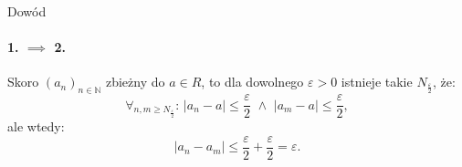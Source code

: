 \documentclass{article}
\newcommand{\N}{\mathbb{N}}
\newcommand{\eps}{\varepsilon}
\newcommand{\ciag}[1]{(#1_{n})_{n \in \N}}
\begin{document}
    \begin{dow}{Dowód}
        \paragraph*{1. $\implies$ 2.} Skoro $\ciag{a}$ zbieżny do $a \in R$, to dla dowolnego $\eps >0$ istnieje takie $N_{\frac{\eps}{2}}$, że: \begin{equation}
            \forall_{n, m \geqslant N_{\frac{\eps}{2}}}: \,|a_n - a| \leqslant \frac{\eps}{2} \,\, \land\,\, |a_m - a| \leqslant \frac{\eps}{2},
        \end{equation}
        ale wtedy: \begin{equation}
            |a_n - a_m| \leqslant \frac{\eps}{2} + \frac{\eps}{2} = \eps.
        \end{equation}
        

\end{dow}
\end{document}
